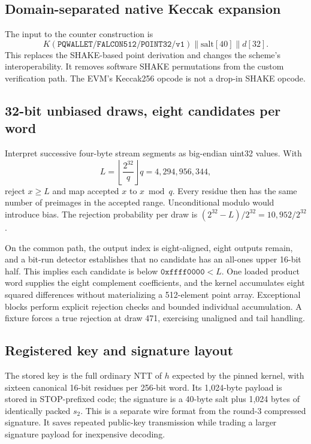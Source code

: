 \documentclass[11pt,a4paper]{article}
\begin{document}
\subsection{Domain-separated native Keccak expansion}
The input to the counter construction is
\begin{equation*}
 K(\texttt{PQWALLET/FALCON512/POINT32/v1})
 \parallel\mathrm{salt}[40]\parallel d[32].
\end{equation*}
This replaces the SHAKE-based point derivation and changes the scheme's
interoperability. It removes software SHAKE permutations from the custom
verification path. The EVM's Keccak256 opcode is not a drop-in SHAKE opcode.

\subsection{32-bit unbiased draws, eight candidates per word}
Interpret successive four-byte stream segments as big-endian uint32 values.
With
\begin{equation}
 L=\left\lfloor\frac{2^{32}}q\right\rfloor q=4{,}294{,}956{,}344,
\end{equation}
reject $x\geq L$ and map accepted $x$ to $x\bmod q$. Every residue then has
the same number of preimages in the accepted range. Unconditional modulo
would introduce bias. The rejection probability per draw is
$(2^{32}-L)/2^{32}=10{,}952/2^{32}$.

On the common path, the output index is eight-aligned, eight outputs remain,
and a bit-run detector establishes that no candidate has an all-ones upper
16-bit half. This implies each candidate is below
$\texttt{0xffff0000}<L$. One loaded product word supplies the eight
complement coefficients, and the kernel accumulates eight squared differences
without materializing a 512-element point array. Exceptional blocks perform
explicit rejection checks and bounded individual accumulation. A fixture
forces a true rejection at draw 471, exercising unaligned and tail handling.

\subsection{Registered key and signature layout}
The stored key is the full ordinary NTT of $h$ expected by the pinned kernel,
with sixteen canonical 16-bit residues per 256-bit word. Its 1,024-byte
payload is stored in STOP-prefixed code; the signature is a 40-byte salt plus
1,024 bytes of identically packed $s_2$. This is a separate wire format from
the round-3 compressed signature. It saves repeated public-key transmission
while trading a larger signature payload for inexpensive decoding.
\end{document}
